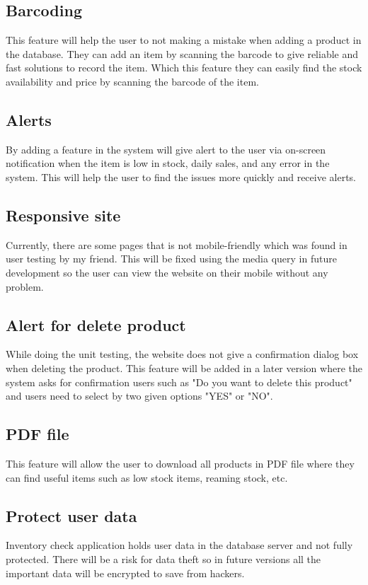 \subsection{Barcoding}
This feature will help the user to not making a mistake when adding a product in the database. They can add an item by scanning the barcode to give reliable and fast solutions to record the item. Which this feature they can easily find the stock availability and price by scanning the barcode of the item.

\subsection{Alerts}
By adding a feature in the system will give alert to the user via on-screen notification when the item is low in stock, daily sales, and any error in the system. This will help the user to find the issues more quickly and receive alerts.

\subsection{Responsive site}
Currently, there are some pages that 
is not mobile-friendly which was found in user testing by my friend. This will be fixed using the media query in future development so the user can view the website on their mobile without any problem.

\subsection{Alert for delete product}
While doing the unit testing, the website does not give a confirmation dialog box when deleting the product. This feature will be added in a later version where the system asks for confirmation users such as "Do you want to delete this product" and users need to select by two given options "YES" or "NO".

\subsection{PDF file}
This feature will allow the user to download all products in PDF file where they can find useful items such as low stock items, reaming stock, etc.

\subsection{Protect user data}
Inventory check application holds user data in the database server and not fully protected. There will be a risk for data theft so in future versions all the important data will be encrypted to save from hackers.

